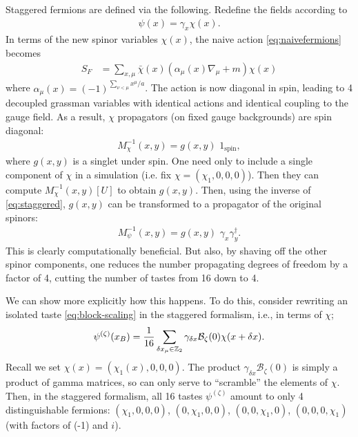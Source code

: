     Staggered fermions are defined via the following. Redefine the fields according to
    \begin{align}
      \psi(x) = \gamma_x \chi(x).
      \label{eq:staggered}
    \end{align}
    In terms of the new spinor variables $\chi(x)$, the naive action \eqref{eq:naivefermions} becomes
    \begin{align}
      S_F &= \sum_{x,\mu} \bar{\chi}(x)(\alpha_{\mu}(x) \nabla_{\mu} + m ) \chi(x)
    \end{align}
    where $\alpha_{\mu}(x) = (-1)^{\sum_{\nu < \mu} x^{\mu}/a}$. The action is now diagonal in spin, leading to 4 decoupled grassman variables with identical actions and identical coupling to the gauge field. As a result, $\chi$ propagators (on fixed gauge backgrounds) are spin diagonal:
    \begin{align}
      M^{-1}_{\chi}(x,y) = g(x,y) \,\, 1_{\text{spin}},
    \end{align}
    where $g(x,y)$ is a singlet under spin. One need only to include a single component of $\chi$ in a simulation (i.e. fix $\chi = (\chi_1,0,0,0)$). Then they can compute $M^{-1}_{\chi}(x,y)[U]$ to obtain $g(x,y)$. Then, using the inverse of \eqref{eq:staggered}, $g(x,y)$ can be transformed to a propagator of the original spinors:
    \begin{align}
      M_{\psi}^{-1}(x,y) = g(x,y) \,\,\gamma_x \gamma^{\dagger}_y.
    \end{align}
    This is clearly computationally beneficial. But also, by shaving off the other spinor components, one reduces the number propagating degrees of freedom by a factor of 4, cutting the number of tastes from 16 down to 4.

    We can show more explicitly how this happens. To do this, consider rewriting an isolated taste \eqref{eq:block-scaling} in the staggered formalism, i.e., in terms of $\chi$;
    \begin{align}
      \psi^{(\zeta)}(x_B) = {1\over 16} \sum_{\delta x_{\mu} \in \mathbb{Z}_2} \gamma_{\delta x} \mathcal{B}_{\zeta}(0) \chi(x+\delta x).
    \end{align}
    Recall we set $\chi(x) = (\chi_1(x),0,0,0)$. The product $\gamma_{\delta x} \mathcal{B}_{\zeta}(0)$ is simply a product of gamma matrices, so can only serve to ``scramble'' the elements of $\chi$. Then, in the staggered formalism, all 16 tastes $\psi^{(\zeta)}$ amount to only 4 distinguishable fermions: $(\chi_1,0,0,0)$, $(0,\chi_1,0,0)$, $(0,0,\chi_1,0)$, $(0,0,0,\chi_1)$ (with factors of (-1) and $i$).

